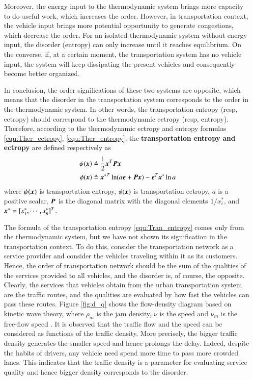 \documentclass[preprint,authoryear,12pt]{elsarticle}
\renewcommand{\vec}[1]{\mbox{\boldmath$#1$}}
\newcommand{\mat}[1]{\mbox{\boldmath$#1$}}
\begin{document}
Moreover, the energy input to the thermodynamic system brings more
capacity to do useful work, which increases the order. However, in
transportation context, the vehicle input brings more potential
opportunity to generate congestions, which decrease the order. For an
isolated thermodynamic system without energy input, the disorder
(entropy) can only increase until it reaches equilibrium. On the
converse, if, at a certain moment, the transportation system has no
vehicle input, the system will keep dissipating the present vehicles
and consequently become better organized.

In conclusion, the order significations of these two systems are
opposite, which means that the disorder in the transportation system
corresponds to the order in the thermodynamic system. In other words,
the transportation entropy (resp, ectropy) should correspond to the
thermodynamic ectropy (resp, entropy). Therefore, according to the
thermodynamic ectropy and entropy formulas \eqref{equ:Ther_ectropy},
\eqref{equ:Ther_entropy}, the \textbf{transportation entropy and
ectropy} are defined respectively as
\begin{align}
\label{equ:Tran_entropy}
\psi(\vec{x}) &\triangleq \frac{1}{2}\vec{x}^T \mat{P} \vec{x}\\
\phi(\vec{x}) &\triangleq{\vec{x}^*}^T \ln
(a\vec{\epsilon}+\mat{P}\vec{x}) -\vec{\epsilon}^T\vec{x}^*\ln a
\label{equ:Tran_ectropy}
\end{align}
where $\psi(\vec{x})$ is transportation entropy, $\phi(\vec{x})$ is
transportation ectropy, $a$ is a positive scalar, $\mat{P}$ is the
diagonal matrix with the diagonal elements $1/x_i^*$, and
$\vec{x}^*=[x_1^*,\cdots,x_n^*]^T$.

The formula of the transportation entropy \eqref{equ:Tran_entropy}
comes only from the thermodynamic system, but we have not shown its
signification in the transportation context. To do this, consider the
transportation network as a service provider and consider the
vehicles traveling within it as its customers. Hence, the order of
transportation network should be the sum of the qualities of the
services provided to all vehicles, and the disorder is, of course,
the opposite. Clearly, the services that vehicles obtain from the
urban transportation system are the traffic routes, and the qualities
are evaluated by how fast the vehicles can pass these routes. Figure
\ref{fig:d_q} shows the flow-density diagram based on kinetic wave
theory, where $\rho_m$ is the jam density, $\nu$ is the speed and
$\nu_m$ is the free-flow speed \citep{ukkusuri_robust_2010}. It is
observed that the traffic flow and the speed can be considered as
functions of the traffic density. More precisely, the bigger traffic
density generates the smaller speed and hence prolongs the delay.
Indeed, despite the habits of drivers, any vehicle need spend more
time to pass more crowded lanes. This indicates that the traffic
density is a parameter for evaluating service quality and hence
bigger density corresponds to the disorder.
\end{document}
